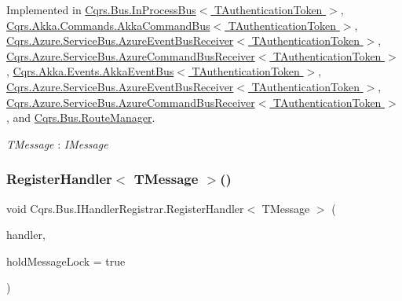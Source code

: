 Implemented in \hyperlink{classCqrs_1_1Bus_1_1InProcessBus_aa14a00defdf2d48b2d0e6a65dbdb12d9}{Cqrs.\+Bus.\+In\+Process\+Bus$<$ T\+Authentication\+Token $>$}, \hyperlink{classCqrs_1_1Akka_1_1Commands_1_1AkkaCommandBus_a8ed33fb315493d52470bc3bc2bf076f2}{Cqrs.\+Akka.\+Commands.\+Akka\+Command\+Bus$<$ T\+Authentication\+Token $>$}, \hyperlink{classCqrs_1_1Azure_1_1ServiceBus_1_1AzureEventBusReceiver_a4bddc0b5394cc90b8c4d973fea1fb293}{Cqrs.\+Azure.\+Service\+Bus.\+Azure\+Event\+Bus\+Receiver$<$ T\+Authentication\+Token $>$}, \hyperlink{classCqrs_1_1Azure_1_1ServiceBus_1_1AzureCommandBusReceiver_a44c5dc0155b965682995d71ae9e1f752}{Cqrs.\+Azure.\+Service\+Bus.\+Azure\+Command\+Bus\+Receiver$<$ T\+Authentication\+Token $>$}, \hyperlink{classCqrs_1_1Akka_1_1Events_1_1AkkaEventBus_a59ec3e497e511b73b5239eee80691443}{Cqrs.\+Akka.\+Events.\+Akka\+Event\+Bus$<$ T\+Authentication\+Token $>$}, \hyperlink{classCqrs_1_1Azure_1_1ServiceBus_1_1AzureEventBusReceiver_a4bddc0b5394cc90b8c4d973fea1fb293}{Cqrs.\+Azure.\+Service\+Bus.\+Azure\+Event\+Bus\+Receiver$<$ T\+Authentication\+Token $>$}, \hyperlink{classCqrs_1_1Azure_1_1ServiceBus_1_1AzureCommandBusReceiver_a44c5dc0155b965682995d71ae9e1f752}{Cqrs.\+Azure.\+Service\+Bus.\+Azure\+Command\+Bus\+Receiver$<$ T\+Authentication\+Token $>$}, and \hyperlink{classCqrs_1_1Bus_1_1RouteManager_a5a01e8a6c9ae6311bca2d9e5cb75a7b9}{Cqrs.\+Bus.\+Route\+Manager}.

\begin{Desc}
\item[Type Constraints]\begin{description}
\item[{\em T\+Message} : {\em I\+Message}]\end{description}
\end{Desc}
\mbox{\label{interfaceCqrs_1_1Bus_1_1IHandlerRegistrar_a07792dcc9a8b272709ff2e2dd336a642}} 
\subsubsection{\texorpdfstring{Register\+Handler$<$ T\+Message $>$()}{RegisterHandler< TMessage >()}\hspace{0.1cm}{\footnotesize\ttfamily [2/2]}}
{\footnotesize\ttfamily void Cqrs.\+Bus.\+I\+Handler\+Registrar.\+Register\+Handler$<$ T\+Message $>$ (\begin{DoxyParamCaption}\item[{Action$<$ T\+Message $>$}]{handler,  }\item[{bool}]{hold\+Message\+Lock = {\ttfamily true} }\end{DoxyParamCaption})}



